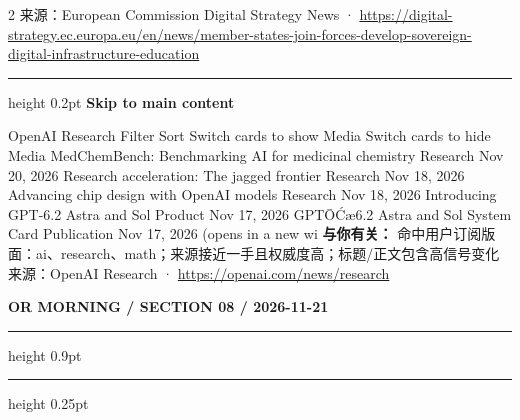 \documentclass[10.5pt]{ctexart}
\begin{document}
\begin{multicols}{2}
{\footnotesize\color{ormuted} 来源：European Commission Digital Strategy News · \url{https://digital-strategy.ec.europa.eu/en/news/member-states-join-forces-develop-sovereign-digital-infrastructure-education}}
\vspace{2mm}
\hrule height 0.2pt
\vspace{2mm}
{\large\bfseries Skip to main content}\par
OpenAI Research Filter Sort Switch cards to show Media Switch cards to hide Media MedChemBench: Benchmarking AI for medicinal chemistry Research Nov 20, 2026 Research acceleration: The jagged frontier Research Nov 18, 2026 Advancing chip design with OpenAI models Research Nov 18, 2026 Introducing GPT-6.2 Astra and Sol Product Nov 17, 2026 GPTŌĆæ6.2 Astra and Sol System Card Publication Nov 17, 2026 (opens in a new wi
\textbf{与你有关：} 命中用户订阅版面：ai、research、math；来源接近一手且权威度高；标题/正文包含高信号变化
{\footnotesize\color{ormuted} 来源：OpenAI Research · \url{https://openai.com/news/research}}
\end{multicols}
\newpage
{\small\bfseries OR MORNING / SECTION 08 / 2026-11-21}
\vspace{2mm}
\hrule height 0.9pt
\vspace{1.5mm}
\hrule height 0.25pt
\vspace{4mm}
\end{document}

